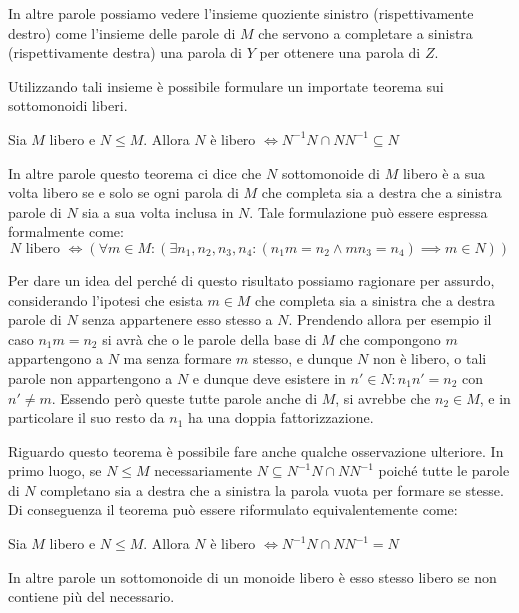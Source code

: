 In altre parole possiamo vedere l'insieme quoziente sinistro (rispettivamente destro) come l'insieme delle parole di \(M\) che servono a completare a sinistra (rispettivamente destra) una parola di \(Y\) per ottenere una parola di \(Z\).

Utilizzando tali insieme è possibile formulare un importate teorema sui sottomonoidi liberi.

\begin{theorem}[Schuïtzenberger]\label{thm:schuïtzenberger}
  Sia \(M\) libero e \(N \leq M\). Allora \(N \text{ è libero } \iff N^{-1}N \cap NN^{-1} \subseteq N\)
\end{theorem}
In altre parole questo teorema ci dice che \(N\) sottomonoide di \(M\) libero è a sua volta libero se e solo se ogni parola di \(M\) che completa sia a destra che a sinistra parole di \(N\) sia a sua volta inclusa in \(N\).
Tale formulazione può essere espressa formalmente come:
\[N \text{ libero } \iff \left(\forall m \in M:(\exists n_1,n_2,n_3,n_4:( n_1m=n_2 \land mn_3=n_4) \implies m \in N)\right)\]

Per dare un idea del perché di questo risultato possiamo ragionare per assurdo, considerando l'ipotesi che esista \(m \in M\) che completa sia a sinistra che a destra parole di \(N\) senza appartenere esso stesso a \(N\).
Prendendo allora per esempio il caso \(n_1m=n_2\) si avrà che o le parole della base di \(M\) che compongono \(m\) appartengono a \(N\) ma senza formare \(m\) stesso, e dunque \(N\) non è libero, o tali parole non appartengono a \(N\) e dunque deve esistere in \(n' \in N: n_1n'=n_2\) con \(n' \neq m\).
Essendo però queste tutte parole anche di \(M\), si avrebbe che \(n_2 \in M\), e in particolare il suo resto da \(n_1\) ha una doppia fattorizzazione.

Riguardo questo teorema è possibile fare anche qualche osservazione ulteriore.
In primo luogo, se \(N\leq M\) necessariamente \(N \subseteq N^{-1}N \cap NN^{-1}\) poiché tutte le parole di \(N\) completano sia a destra che a sinistra la parola vuota per formare se stesse.
Di conseguenza il teorema può essere riformulato equivalentemente come:
\begin{theorem}
  Sia \(M\) libero e \(N \leq M\). Allora \(N \text{ è libero } \iff N^{-1}N \cap NN^{-1} = N\)
\end{theorem}
In altre parole un sottomonoide di un monoide libero è esso stesso libero se non contiene più del necessario.

